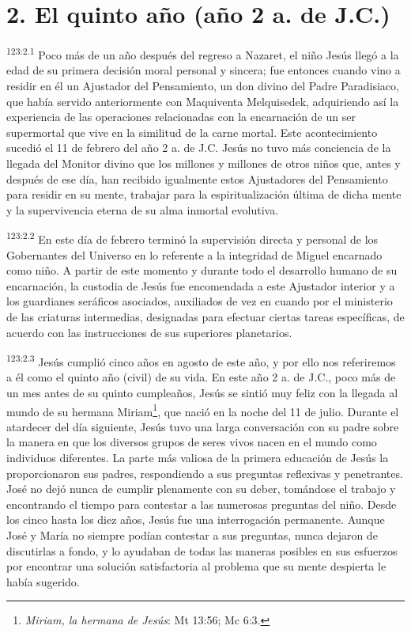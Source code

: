 \section*{2. El quinto año (año 2 a. de J.C.)}
\par
\textsuperscript{123:2.1} Poco más de un año después del regreso a Nazaret, el niño Jesús llegó a la edad de su primera decisión moral personal y sincera; fue entonces cuando vino a residir en él un Ajustador del Pensamiento, un don divino del Padre Paradisiaco, que había servido anteriormente con Maquiventa Melquisedek, adquiriendo así la experiencia de las operaciones relacionadas con la encarnación de un ser supermortal que vive en la similitud de la carne mortal. Este acontecimiento sucedió el 11 de febrero del año 2 a. de J.C. Jesús no tuvo más conciencia de la llegada del Monitor divino que los millones y millones de otros niños que, antes y después de ese día, han recibido igualmente estos Ajustadores del Pensamiento para residir en su mente, trabajar para la espiritualización última de dicha mente y la supervivencia eterna de su alma inmortal evolutiva.

\par
\textsuperscript{123:2.2} En este día de febrero terminó la supervisión directa y personal de los Gobernantes del Universo en lo referente a la integridad de Miguel encarnado como niño. A partir de este momento y durante todo el desarrollo humano de su encarnación, la custodia de Jesús fue encomendada a este Ajustador interior y a los guardianes seráficos asociados, auxiliados de vez en cuando por el ministerio de las criaturas intermedias, designadas para efectuar ciertas tareas específicas, de acuerdo con las instrucciones de sus superiores planetarios.

\par
\textsuperscript{123:2.3} Jesús cumplió cinco años en agosto de este año, y por ello nos referiremos a él como el quinto año (civil) de su vida. En este año 2 a. de J.C., poco más de un mes antes de su quinto cumpleaños, Jesús se sintió muy feliz con la llegada al mundo de su hermana Miriam\footnote{\textit{Miriam, la hermana de Jesús}: Mt 13:56; Mc 6:3.}, que nació en la noche del 11 de julio. Durante el atardecer del día siguiente, Jesús tuvo una larga conversación con su padre sobre la manera en que los diversos grupos de seres vivos nacen en el mundo como individuos diferentes. La parte más valiosa de la primera educación de Jesús la proporcionaron sus padres, respondiendo a sus preguntas reflexivas y penetrantes. José no dejó nunca de cumplir plenamente con su deber, tomándose el trabajo y encontrando el tiempo para contestar a las numerosas preguntas del niño. Desde los cinco hasta los diez años, Jesús fue una interrogación permanente. Aunque José y María no siempre podían contestar a sus preguntas, nunca dejaron de discutirlas a fondo, y lo ayudaban de todas las maneras posibles en sus esfuerzos por encontrar una solución satisfactoria al problema que su mente despierta le había sugerido.

